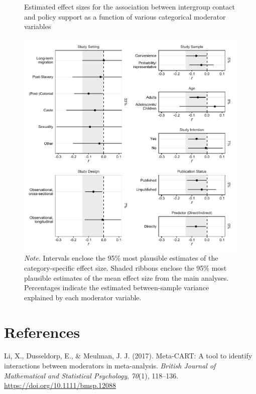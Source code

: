 \documentclass[12pt, letterpaper]{article}
\begin{document}
\begin{figure}
\centering
\caption{Estimated effect sizes for the association between intergroup contact and policy support as a function of various categorical moderator variables}
\includegraphics[scale=1]{../figures/figure-s2}
\caption*{\textit{Note.} Intervals enclose the 95\% most plausible estimates of the category-specific effect size. Shaded ribbons enclose the 95\% most plausible estimates of the mean effect size from the main analyses. Percentages indicate the estimated between-sample variance explained by each moderator variable.}
\label{fig:s2}
\end{figure}

\newpage

\hypertarget{references}{%
\section{References}\label{references}}

\begingroup

\noindent \setlength{\parindent}{-0.5in} \setlength{\leftskip}{0.5in}

\hypertarget{refs}{}
\leavevmode\hypertarget{ref-li_meta-cart_2017}{}%
Li, X., Dusseldorp, E., \& Meulman, J. J. (2017). Meta-CART: A tool to
identify interactions between moderators in meta-analysis. \emph{British
Journal of Mathematical and Statistical Psychology}, \emph{70}(1),
118--136. \url{https://doi.org/10.1111/bmsp.12088}
\end{document}
